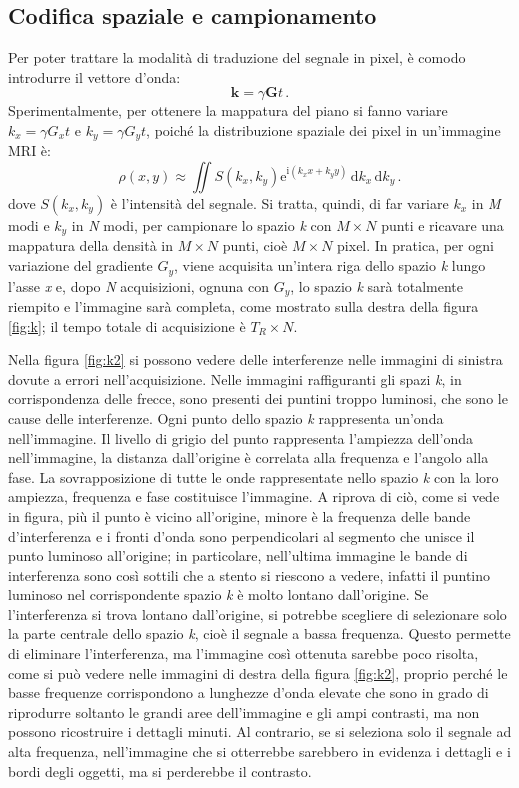 \documentclass{report}
\newcommand{\figref}[1]{figura \ref{#1}}
\numberwithin{equation}{section}
\numberwithin{figure}{section}
\renewcommand{\Vec}{\bm}
\begin{document}
\subsection{Codifica spaziale e campionamento} \label{1.4.4}
Per poter trattare la modalità di traduzione del segnale in pixel, è comodo introdurre il vettore d'onda:
\begin{equation}
    \Vec{k}=\gamma \Vec{G}t \,.
\end{equation}
Sperimentalmente, per ottenere la mappatura del piano si fanno variare $k_x=\gamma G_x t$ e $k_y=\gamma G_y t$, poiché la distribuzione spaziale dei pixel in un'immagine MRI è:
\begin{equation}
    \rho(x,y) \approx \iint S(k_x,k_y) \mathrm{e}^{\mathrm{i}(k_xx+k_yy)}\,\mathrm{d}k_x\,\mathrm{d}k_y\,.
\end{equation}
dove $S(k_x,k_y)$ è l'intensità del segnale. Si tratta, quindi, di far variare $k_x$ in \textit{M} modi e $k_y$ in \textit{N} modi, per campionare lo spazio \textit{k} con $M \times N$ punti e ricavare una mappatura della densità in $M \times N$ punti, cioè $M \times N$ pixel. In pratica, per ogni variazione del gradiente $G_y$, viene acquisita un’intera riga dello spazio \textit{k} lungo l’asse \textit{x} e, dopo \textit{N} acquisizioni, ognuna con $G_y$, lo spazio \textit{k} sarà totalmente riempito e l'immagine sarà completa, come mostrato sulla destra della \figref{fig:k}; il tempo totale di acquisizione è $T_R \times N$.

Nella \figref{fig:k2} si possono vedere delle interferenze nelle immagini di sinistra dovute a errori nell'acquisizione. Nelle immagini raffiguranti gli spazi \textit{k}, in corrispondenza delle frecce, sono presenti dei puntini troppo luminosi, che sono le cause delle interferenze. Ogni punto dello spazio \textit{k} rappresenta un’onda nell'immagine. Il livello di grigio del punto rappresenta l’ampiezza dell'onda nell'immagine, la distanza dall'origine è correlata alla frequenza e l’angolo alla fase. La sovrapposizione di tutte le onde rappresentate nello spazio \textit{k} con la loro ampiezza, frequenza e fase costituisce l’immagine. A riprova di ciò, come si vede in figura, più il punto è vicino all'origine, minore è la frequenza delle bande d'interferenza e i fronti d'onda sono perpendicolari al segmento che unisce il punto luminoso all'origine; in particolare, nell'ultima immagine le bande di interferenza sono così sottili che a stento si riescono a vedere, infatti il puntino luminoso nel corrispondente spazio \textit{k} è molto lontano dall'origine. Se l'interferenza si trova lontano dall'origine, si potrebbe scegliere di selezionare solo la parte centrale dello spazio \textit{k}, cioè il segnale a bassa frequenza. Questo permette di eliminare l'interferenza, ma l'immagine così ottenuta sarebbe poco risolta, come si può vedere nelle immagini di destra della \figref{fig:k2}, proprio perché le basse frequenze corrispondono a lunghezze d'onda elevate che sono in grado di riprodurre soltanto le grandi aree dell'immagine e gli ampi contrasti, ma non possono ricostruire i dettagli minuti. Al contrario, se si seleziona solo il segnale ad alta frequenza, nell'immagine che si otterrebbe sarebbero in evidenza i dettagli e i bordi degli oggetti, ma si perderebbe il contrasto.
\end{document}
